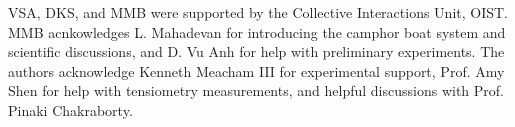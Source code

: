 \documentclass[journal=langd5, manuscript=article, layout=twocolumn]{achemso}
\begin{document}
\begin{acknowledgement}
VSA, DKS, and MMB were supported by the Collective Interactions Unit, OIST. MMB acnkowledges L. Mahadevan for introducing the camphor boat system and scientific discussions, and D. Vu Anh for help with preliminary experiments. The authors acknowledge Kenneth Meacham III for experimental support, Prof. Amy Shen for help with tensiometry measurements, and helpful discussions with Prof. Pinaki Chakraborty.
\end{acknowledgement}




\end{document}
